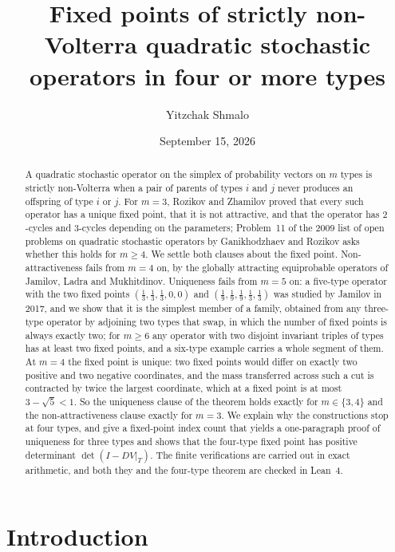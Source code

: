 \documentclass[11pt]{amsart}
\title[Fixed points of strictly non-Volterra operators]{Fixed points of strictly non-Volterra quadratic stochastic operators in four or more types}
\author{Yitzchak Shmalo}
\date{September 15, 2026}
\theoremstyle{definition}
\begin{document}
\begin{abstract}
A quadratic stochastic operator on the simplex of probability vectors on $m$ types is strictly non-Volterra when a pair of parents of types $i$ and $j$ never produces an offspring of type $i$ or $j$. For $m=3$, Rozikov and Zhamilov proved that every such operator has a unique fixed point, that it is not attractive, and that the operator has $2$-cycles and $3$-cycles depending on the parameters; Problem~11 of the 2009 list of open problems on quadratic stochastic operators by Ganikhodzhaev and Rozikov asks whether this holds for $m\ge4$. We settle both clauses about the fixed point. Non-attractiveness fails from $m=4$ on, by the globally attracting equiprobable operators of Jamilov, Ladra and Mukhitdinov. Uniqueness fails from $m=5$ on: a five-type operator with the two fixed points $(\frac13,\frac13,\frac13,0,0)$ and $(\frac19,\frac19,\frac19,\frac13,\frac13)$ was studied by Jamilov in 2017, and we show that it is the simplest member of a family, obtained from any three-type operator by adjoining two types that swap, in which the number of fixed points is always exactly two; for $m\ge6$ any operator with two disjoint invariant triples of types has at least two fixed points, and a six-type example carries a whole segment of them. At $m=4$ the fixed point is unique: two fixed points would differ on exactly two positive and two negative coordinates, and the mass transferred across such a cut is contracted by twice the largest coordinate, which at a fixed point is at most $3-\sqrt5<1$. So the uniqueness clause of the theorem holds exactly for $m\in\{3,4\}$ and the non-attractiveness clause exactly for $m=3$. We explain why the constructions stop at four types, and give a fixed-point index count that yields a one-paragraph proof of uniqueness for three types and shows that the four-type fixed point has positive determinant $\det(I-DV|_T)$. The finite verifications are carried out in exact arithmetic, and both they and the four-type theorem are checked in Lean~4.
\end{abstract}

\maketitle

\section{Introduction}
\end{document}
